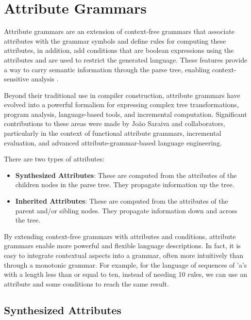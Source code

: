 \section{Attribute Grammars}

Attribute grammars are an extension of context-free 
grammars that associate attributes with the grammar symbols 
and define rules for computing these attributes, in addition, add conditions that are boolean expressions using the attributes and are used to restrict the generated language. 
These features provide a way to carry semantic information 
through the parse tree, enabling context-sensitive analysis \cite{cit5}.

Beyond their traditional use in compiler construction, attribute grammars have evolved into a powerful formalism for expressing complex 
tree transformations, program analysis, language-based tools, and incremental computation. Significant contributions to these areas 
were made by João Saraiva and collaborators, particularly in the context of functional attribute grammars, incremental 
evaluation, and advanced attribute-grammar-based language engineering. \cite{Saraiva2000,Martins2014}

There are two types of attributes:

\begin{itemize}
  \item \textbf{Synthesized Attributes}: These are computed from the attributes of the children nodes in the parse tree. They propagate information up the tree.
  \item \textbf{Inherited Attributes}: These are computed from the attributes of the parent and/or sibling nodes. They propagate information down and across the tree.
\end{itemize}

By extending context-free grammars with attributes and conditions, attribute grammars enable more powerful and flexible language descriptions. 
In fact, it is easy to integrate contextual aspects into a grammar, often more intuitively than through a monotonic grammar.
For example, for the language of sequences of 'a's with a length less than or equal to ten, instead of needing 10 rules, we can use an attribute and some conditions to reach the same result.

\subsection{Synthesized Attributes}

